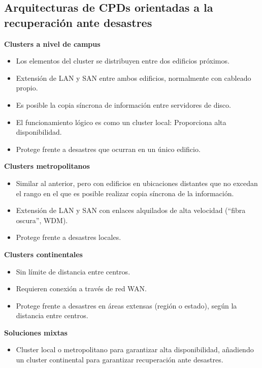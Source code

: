\subsection{Arquitecturas de CPDs orientadas a la recuperación ante desastres}\label{cluster:disaster}
\textbf{Clusters a nivel de campus}
\begin{itemize}
\item Los elementos del cluster se distribuyen entre dos edificios próximos.
\item Extensión de LAN y SAN entre ambos edificios, normalmente con cableado propio.
\item Es posible la copia síncrona de información entre servidores de disco.
\item El funcionamiento lógico es como un cluster local: Proporciona alta disponibilidad.
\item Protege frente a desastres que ocurran en un único edificio.

\end{itemize}

\textbf{Clusters metropolitanos}
\begin{itemize}
\item Similar al anterior, pero con edificios en ubicaciones distantes que no excedan el rango en el que es posible realizar copia síncrona de la información.
\item Extensión de LAN y SAN con enlaces alquilados de alta velocidad (``fibra oscura'', WDM).
\item Protege frente a desastres locales.

\end{itemize}

\textbf{Clusters continentales}
\begin{itemize}
\item Sin límite de distancia entre centros.
\item Requieren conexión a través de red WAN.
\item Protege frente a desastres en áreas extensas (región o estado), según la distancia entre centros.

\end{itemize}
\newpage
\textbf{Soluciones mixtas}
\begin{itemize}
\item Cluster local o metropolitano para garantizar alta disponibilidad, añadiendo un cluster continental para garantizar recuperación ante desastres.

\end{itemize}

